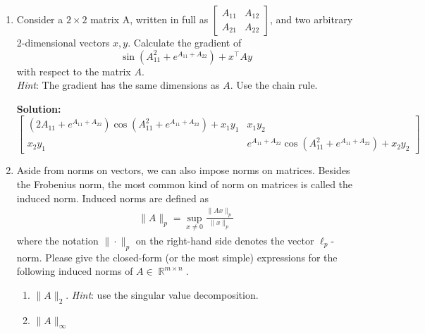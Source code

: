 \documentclass{article}
\DeclareMathOperator{\R}{\mathbb{R}}
\newenvironment{solution}{\color{blue} \smallskip \textbf{Solution:}}{}
\begin{document}
\begin{enumerate}

    \item 
    Consider a $2 \times 2$ matrix A, written in full as
    $\begin{bmatrix} A_{11} & A_{12} \\ A_{21} & A_{22} \end{bmatrix}$, and two arbitrary 2-dimensional vectors $x, y$.
    Calculate the gradient of
    \[\sin(A^2_{11}+e^{A_{11}+A_{22}}) + x^\top A y\]
    with respect to the matrix $A$. \\
    \emph{Hint}: The gradient has the same dimensions as $A$. Use the chain rule.
    
    \begin{solution}
        $$
        \begin{bmatrix}
            (2 A_{11}+e^{A_{11}+A_{22}})\cos(A^2_{11}+e^{A_{11}+A_{22}}) + x_1 y_1 & x_1 y_2\\
            x_2 y_1 & e^{A_{11}+A_{22}}\cos(A^2_{11}+e^{A_{11}+A_{22}}) + x_2 y_2
        \end{bmatrix}
        $$
    \end{solution}

    \item 
    Aside from norms on vectors, we can also impose norms on matrices.
    Besides the Frobenius norm, the most common kind of norm on matrices is called the induced norm.
    Induced norms are defined as
    \begin{align*}
        \|A\|_{p} = \sup_{x \neq 0} \frac{\|Ax\|_p}{\|x\|_p}
    \end{align*}
    where the notation $\|\cdot\|_p$ on the right-hand side denotes the vector $\ell_p$-norm.
    Please give the closed-form (or the most simple) expressions for the following induced norms of $A \in \R^{m \times n}$.  
    \begin{enumerate}
        \item $\|A\|_{2}$. \emph{Hint}: use the singular value decomposition.
        \item $\|A\|_{\infty}$
    \end{enumerate}
    

\end{enumerate}
\end{document}
